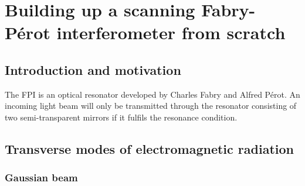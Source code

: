 \chapter{Building up a scanning Fabry-Pérot interferometer from scratch}
\label{chapter:scanning-fabry-perot}
\section{Introduction and motivation}


The \ac{FPI} is an optical resonator developed by Charles Fabry and Alfred Pérot.
An incoming light beam will only be transmitted through the resonator consisting of two semi-transparent mirrors if it fulfils the resonance condition.\cite{kaldewey_coherent_2017}


\section{Transverse modes of electromagnetic radiation}



\subsection{Gaussian beam}
\label{subsec:gaussian-beam}

